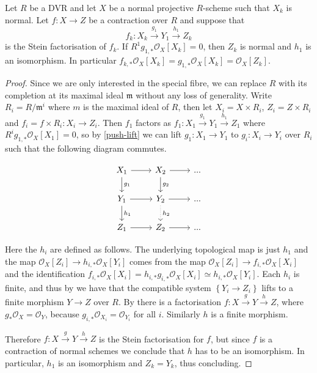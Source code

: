 \documentclass[a4paper,12pt]{book}
\newcommand{\cO}{\mathcal{O}}
\newcommand{\ox}{\mathcal{O}_{X}}
\begin{document}
\begin{theorem}\label{adj-push}
	Let $R$ be a DVR and let $X$ be a normal projective $R$-scheme such that $X_{k}$ is normal. 
	Let $f \colon X \to Z$ be a contraction over $R$ and suppose that $$f_{k}\colon X_{k} \xrightarrow{g_{1}} Y_{1} \xrightarrow{h_{1}} Z_{k}$$ is the Stein factorisation of $f_{k}$. If $R^{1}g_{1,*} \ox[X_{k}]=0$, then $Z_k$ is normal and $h_{1}$ is an isomorphism. In particular $f_{k,*}\ox[X_{k}]=g_{1,*}\ox[X_{k}]=\ox[Z_{k}].$
\end{theorem}

\begin{proof}
	Since we are only interested in the special fibre, we can replace $R$ with its completion at its maximal ideal $\mathfrak{m}$ without any loss of generality.
	Write $R_{i}=R/\mathfrak{m}^{i}$ where $m$ is the maximal ideal of $R$, then let $X_{i}=X \times R_{i}$, $Z_{i}=Z\times R_{i}$ and $f_{i}=f\times R_{i}\colon X_{i} \to Z_{i}$.
	Then $f_{1}$ factors as $f_{1}\colon X_{1} \xrightarrow{g_{1}} Y_{1} \xrightarrow{h_{1}} Z_{1}$ where $R^{i}g_{1,*}\ox[X_{1}]=0$, so by \autoref{push-lift} we can lift $g_{1}\colon X_{1} \to Y_{1}$ to $g_{i}\colon X_{i} \to Y_{i}$ over $R_{i}$ such that the following diagram commutes.
	
	\[\begin{tikzcd}
	X_{1} \arrow[r] \arrow[d, "g_{1}"] & X_{2} \arrow[r] \arrow[d, "g_{2}"] & ... \\
	Y_{1} \arrow[r] \arrow[d, "h_{1}"] & Y_{2} \arrow[d, dotted, "h_{2}"] \arrow[r]  & ... \\
	Z_{1} \arrow[r]                    & Z_{2} \arrow[r]                    & ...
	\end{tikzcd}\]
	
	Here the $h_{i}$ are defined as follows. The underlying topological map is just $h_{1}$ and the map $\ox[Z_{i}] \to h_{i,*}\ox[Y_{i}]$ comes from the map ${\ox[Z_{i}] \to f_{i,*}\ox[X_{i}]}$ and the identification $f_{i,*}\ox[X_{i}]=h_{i,*}g_{i,*}\ox[X_{i}]\simeq h_{i,*}\ox[Y_{i}]$.
	Each $h_{i}$ is finite, and thus by
	\cite[\href{https://stacks.math.columbia.edu/tag/09ZT}{Tag 09ZT}]{stacks-project} we have that the compatible system $\left\{Y_{i} \to Z_i \right\}$ lifts to a finite morphism $Y \to Z$ over $R$. By \cite[\href{https://stacks.math.columbia.edu/tag/0A42}{Tag 0A42}]{stacks-project} there is a factorisation ${f\colon X \xrightarrow{g} Y \xrightarrow{h} Z}$, where $g_{*}\ox = \cO_Y$, because $g_{i,*}\cO_{X_i}=\cO_{Y_i}$ for all $i$. Similarly $h$ is a finite morphism. 
	
	Therefore $f \colon X \xrightarrow{g} Y \xrightarrow{h} Z$ is the Stein factorisation for $f$, but since $f$ is a contraction of normal schemes we conclude that $h$ has to be an isomorphism.
	In particular, $h_1$ is an isomorphism and $Z_{k}=Y_{k}$, thus concluding.
\end{proof}
\end{document}
